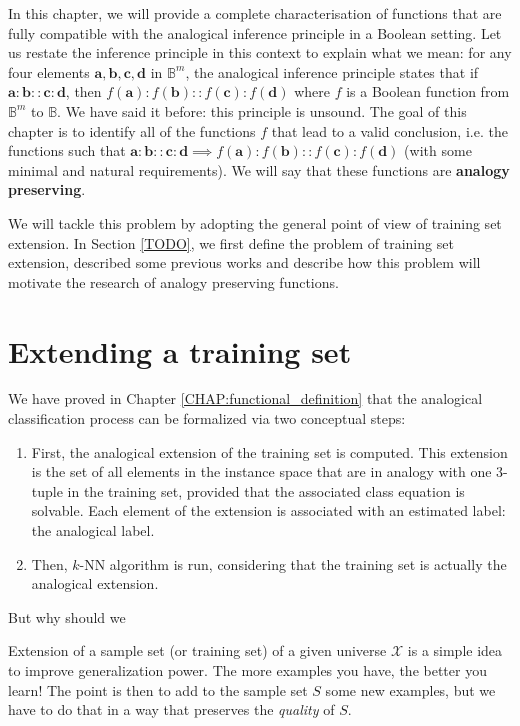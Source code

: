 In this chapter, we will provide a complete characterisation of functions that
are fully compatible with the analogical inference principle in a Boolean
setting. Let us restate the inference principle in this context to explain what
we mean: for any four elements $\mathbf{a}, \mathbf{b}, \mathbf{c}, \mathbf{d}$
in $\mathbb{B}^m$, the analogical inference principle states that if
$\mathbf{a}: \mathbf{b}:: \mathbf{c}: \mathbf{d}$, then $f(\mathbf{a}):
f(\mathbf{b}):: f(\mathbf{c}): f(\mathbf{d})$ where $f$ is a Boolean function
from $\mathbb{B}^m$ to $\mathbb{B}$. We have said it before:  this principle is
unsound. The goal of this chapter is to identify all of the functions $f$ that
lead to a valid conclusion, i.e. the functions such that $\mathbf{a}:
\mathbf{b}:: \mathbf{c}: \mathbf{d} \implies f(\mathbf{a}):f(\mathbf{b})::
f(\mathbf{c}): f(\mathbf{d})$ (with some minimal and natural requirements). We
will say that these functions are \textbf{analogy preserving}.

We will tackle this problem by adopting the general point of view of training
set extension. In Section \ref{TODO}, we first define the problem of training
set extension, described some previous works and describe how this problem will
motivate the research of analogy preserving functions.

\section{Extending a training set}\label{extending}

We have proved in Chapter \ref{CHAP:functional_definition} that the analogical
classification process can be formalized via two conceptual steps:
\begin{enumerate}
  \item First, the analogical extension of the training set is computed. This
    extension is the set of all elements in the instance space that are in
    analogy with one $3$-tuple in the training set, provided that the
    associated class equation is solvable. Each element of the extension is
    associated with an estimated label: the analogical label.
  \item Then, $k$-NN algorithm is run, considering that the training set is
    actually the analogical extension.
\end{enumerate}

But why should we 

Extension of a sample set (or training set) of a given universe $\mathcal{X}$
is a simple idea to improve generalization power. The more examples you have,
the better you learn! The point is then to add to the sample set $S$ some new
examples, but we have to do that in a way that preserves the \textit{quality}
of $S$.

